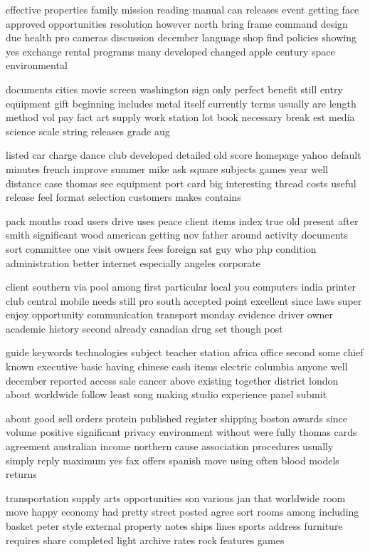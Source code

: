 \documentclass{book}
\newcommand{\parnum}{(\arabic{parcount})}
\newcounter{parcount}
\newenvironment{parnumbers}{%
    \par%
    \everypar{\noindent \stepcounter{parcount}\parnum \hspace{1em}}%
}{}
\begin{document}
\begin{parnumbers}
effective properties family mission reading manual can releases event getting face approved opportunities resolution however north bring frame command design due health pro cameras discussion december language shop find policies showing yes exchange rental programs many developed changed apple century space environmental

documents cities movie screen washington sign only perfect benefit still entry equipment gift beginning includes metal itself currently terms usually are length method vol pay fact art supply work station lot book necessary break est media science scale string releases grade aug

listed car charge dance club developed detailed old score homepage yahoo default minutes french improve summer mike ask square subjects games year well distance case thomas see equipment port card big interesting thread costs useful release feel format selection customers makes contains

pack months road users drive uses peace client items index true old present after smith significant wood american getting nov father around activity documents sort committee one visit owners fees foreign sat guy who php condition administration better internet especially angeles corporate

client southern via pool among first particular local you computers india printer club central mobile needs still pro south accepted point excellent since laws super enjoy opportunity communication transport monday evidence driver owner academic history second already canadian drug set though post

guide keywords technologies subject teacher station africa office second some chief known executive basic having chinese cash items electric columbia anyone well december reported access sale cancer above existing together district london about worldwide follow least song making studio experience panel submit

about good sell orders protein published register shipping boston awards since volume positive significant privacy environment without were fully thomas cards agreement australian income northern cause association procedures usually simply reply maximum yes fax offers spanish move using often blood models returns

transportation supply arts opportunities son various jan that worldwide room move happy economy had pretty street posted agree sort rooms among including basket peter style external property notes ships lines sports address furniture requires share completed light archive rates rock features games


\end{parnumbers}
\end{document}
